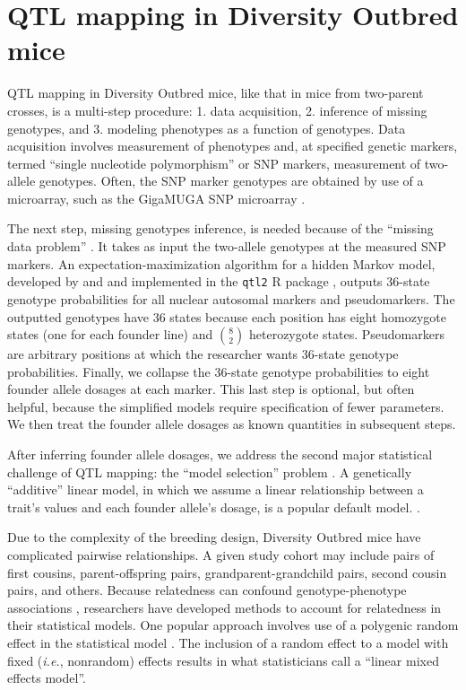\documentclass[oneside]{book}\usepackage[]{graphicx}\usepackage[]{color}
\begin{document}
\section{QTL mapping in Diversity Outbred mice}\label{sec:do-qtl}

QTL mapping in Diversity Outbred mice, like that in mice from two-parent 
crosses, is a multi-step procedure: 1. data acquisition, 2. inference of 
missing genotypes, and 3. modeling phenotypes as a function of genotypes. 
Data acquisition involves measurement of phenotypes and, at specified 
genetic markers, termed ``single nucleotide polymorphism'' or SNP markers, 
measurement of two-allele genotypes. Often, the SNP marker genotypes are 
obtained by use of a microarray, such as the GigaMUGA SNP microarray 
\citep{morgan2015mouse}. 

The next step, missing genotypes inference, is needed because of the 
``missing data problem'' \citep{broman2009guide}. It takes as input the two-allele 
genotypes at the measured SNP markers. An expectation-maximization algorithm 
\citep{dempster1977maximum} for a hidden Markov model, developed by
\citet{broman2012haplotype} and \citet{broman2012genotype} and implemented in the \texttt{qtl2} R 
package \citep{broman2019rqtl2}, outputs 36-state genotype probabilities for all 
nuclear autosomal markers and pseudomarkers. The outputted genotypes have 36 states 
because each position has eight homozygote states (one for each founder line) and $\binom{8}{2}$ heterozygote states. Pseudomarkers are 
arbitrary positions at which the researcher wants 36-state genotype probabilities. 
Finally, we collapse the 36-state genotype probabilities to eight founder allele 
dosages at each marker. This last step is optional, but often helpful, because the 
simplified models require specification of fewer parameters. We then treat the 
founder allele dosages as known quantities in subsequent steps. 


After inferring founder allele dosages, we address the
second major statistical challenge of 
QTL mapping: the ``model selection'' problem \citep{broman2009guide}.
A genetically ``additive'' linear model, in which
we assume a linear relationship between
a trait's values and each founder allele's dosage, is a popular default model.
\citep{gatti2014quantitative,broman2019rqtl2}.




Due to the complexity of the breeding design, Diversity Outbred mice
have 
complicated pairwise relationships. A given study cohort may include pairs of first
cousins, parent-offspring pairs, grandparent-grandchild pairs, second cousin pairs, and others.
Because relatedness can confound genotype-phenotype associations 
\citep{yang2014advantages}, researchers have developed methods to account 
for relatedness in their statistical models. One popular approach involves 
use of a polygenic random effect in the statistical model \citep{kang2008efficient}.
The inclusion of a random effect to a model with fixed (\emph{i.e.}, nonrandom)
effects results in what statisticians call a ``linear mixed effects model''. 
\end{document}
